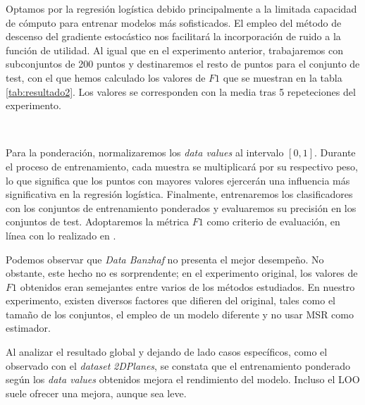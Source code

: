 Optamos por la regresión logística debido
principalmente a la limitada capacidad de cómputo para entrenar
modelos más sofisticados. El empleo del método de descenso del
gradiente estocástico nos facilitará la incorporación de ruido a
la función de utilidad. Al igual que en el experimento anterior,
trabajaremos con subconjuntos de 200 puntos y destinaremos
el resto de puntos para el conjunto de test, con el que
hemos calculado los valores de $F1$ que se muestran en la
tabla \ref{tab:resultado2}. Los valores se corresponden con
la media tras 5 repeteciones del experimento.

\

Para la ponderación, normalizaremos los \textit{data values}
al intervalo $[0,1]$. Durante el proceso de
entrenamiento, cada muestra se multiplicará por su respectivo
peso, lo que significa que los puntos con mayores valores
ejercerán una influencia más significativa en la regresión
logística. Finalmente, entrenaremos los clasificadores con
los conjuntos de entrenamiento ponderados y evaluaremos su
precisión en los conjuntos de test. Adoptaremos la métrica
$F1$ como criterio de evaluación, en línea con lo realizado en
\cite{dataBanzhaf}.

\clearpage

Podemos observar que
\textit{Data Banzhaf} no presenta el mejor desempeño.
No obstante, este hecho no es sorprendente; en el experimento
original, los valores de $F1$ obtenidos eran semejantes entre
varios de los métodos estudiados. En nuestro experimento,
existen diversos factores que difieren del original, tales
como el tamaño de los conjuntos, el empleo de un modelo
diferente y no usar MSR como estimador.

Al analizar el resultado global y dejando de lado casos
específicos, como el observado con el \textit{dataset}
\textit{2DPlanes}, se constata que el entrenamiento ponderado
según los \textit{data values} obtenidos mejora el
rendimiento del modelo. Incluso el LOO suele ofrecer una
mejora, aunque sea leve.


